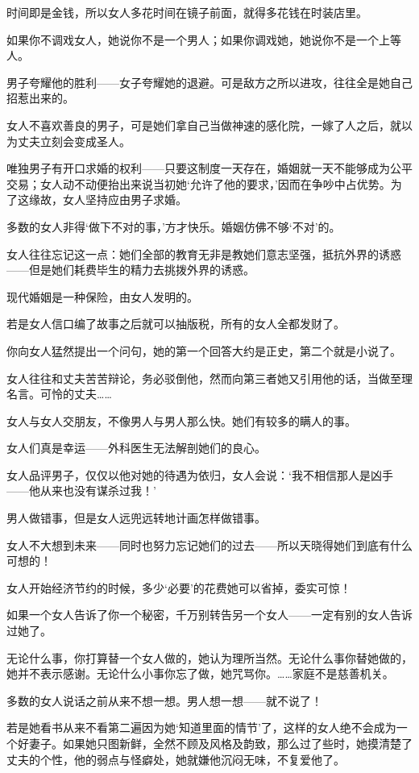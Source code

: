 \par 时间即是金钱，所以女人多花时间在镜子前面，就得多花钱在时装店里。
\par 如果你不调戏女人，她说你不是一个男人；如果你调戏她，她说你不是一个上等人。
\par 男子夸耀他的胜利——女子夸耀她的退避。可是敌方之所以进攻，往往全是她自己招惹出来的。
\par 女人不喜欢善良的男子，可是她们拿自己当做神速的感化院，一嫁了人之后，就以为丈夫立刻会变成圣人。
\par 唯独男子有开口求婚的权利——只要这制度一天存在，婚姻就一天不能够成为公平交易；女人动不动便抬出来说当初她‘允许了他的要求，’因而在争吵中占优势。为了这缘故，女人坚持应由男子求婚。
\par 多数的女人非得‘做下不对的事，’方才快乐。婚姻仿佛不够‘不对’的。
\par 女人往往忘记这一点：她们全部的教育无非是教她们意志坚强，抵抗外界的诱惑——但是她们耗费毕生的精力去挑拨外界的诱惑。
\par 现代婚姻是一种保险，由女人发明的。
\par 若是女人信口编了故事之后就可以抽版税，所有的女人全都发财了。
\par 你向女人猛然提出一个问句，她的第一个回答大约是正史，第二个就是小说了。
\par 女人往往和丈夫苦苦辩论，务必驳倒他，然而向第三者她又引用他的话，当做至理名言。可怜的丈夫……
\par 女人与女人交朋友，不像男人与男人那么快。她们有较多的瞒人的事。
\par 女人们真是幸运——外科医生无法解剖她们的良心。
\par 女人品评男子，仅仅以他对她的待遇为依归，女人会说：‘我不相信那人是凶手——他从来也没有谋杀过我！’
\par 男人做错事，但是女人远兜远转地计画怎样做错事。
\par 女人不大想到未来——同时也努力忘记她们的过去——所以天晓得她们到底有什么可想的！
\par 女人开始经济节约的时候，多少‘必要’的花费她可以省掉，委实可惊！
\par 如果一个女人告诉了你一个秘密，千万别转告另一个女人——一定有别的女人告诉过她了。
\par 无论什么事，你打算替一个女人做的，她认为理所当然。无论什么事你替她做的，她并不表示感谢。无论什么小事你忘了做，她咒骂你。……家庭不是慈善机关。
\par 多数的女人说话之前从来不想一想。男人想一想——就不说了！
\par 若是她看书从来不看第二遍因为她‘知道里面的情节’了，这样的女人绝不会成为一个好妻子。如果她只图新鲜，全然不顾及风格及韵致，那么过了些时，她摸清楚了丈夫的个性，他的弱点与怪癖处，她就嫌他沉闷无味，不复爱他了。
